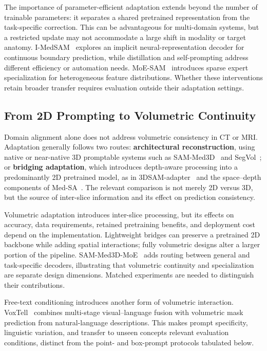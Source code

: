 \documentclass[5p,times,authoryear]{elsarticle}
\begin{document}
The importance of parameter-efficient adaptation extends beyond the number of trainable parameters: it separates a shared pretrained representation from the task-specific correction. This can be advantageous for multi-domain systems, but a restricted update may not accommodate a large shift in modality or target anatomy. I-MedSAM~\citep{wei2024imedsam} explores an implicit neural-representation decoder for continuous boundary prediction, while distillation and self-prompting address different efficiency or automation needs. MoE-SAM~\citep{li2025moe} introduces sparse expert specialization for heterogeneous feature distributions. Whether these interventions retain broader transfer requires evaluation outside their adaptation settings.

\subsection{From 2D Prompting to Volumetric Continuity}

Domain alignment alone does not address volumetric consistency in CT or MRI. Adaptation generally follows two routes: \textbf{architectural reconstruction}, using native or near-native 3D promptable systems such as SAM-Med3D~\citep{wang2025sam} and SegVol~\citep{du2024segvol}; or \textbf{bridging adaptation}, which introduces depth-aware processing into a predominantly 2D pretrained model, as in 3DSAM-adapter~\citep{gong20243dsam} and the space--depth components of Med-SA~\citep{wu2025medsa}. The relevant comparison is not merely 2D versus 3D, but the source of inter-slice information and its effect on prediction consistency.

Volumetric adaptation introduces inter-slice processing, but its effects on accuracy, data requirements, retained pretraining benefits, and deployment cost depend on the implementation. Lightweight bridges can preserve a pretrained 2D backbone while adding spatial interactions; fully volumetric designs alter a larger portion of the pipeline. SAM-Med3D-MoE~\citep{wang2024sam} adds routing between general and task-specific decoders, illustrating that volumetric continuity and specialization are separate design dimensions. Matched experiments are needed to distinguish their contributions.

Free-text conditioning introduces another form of volumetric interaction. VoxTell~\citep{rokuss2026voxtell_cvpr} combines multi-stage visual--language fusion with volumetric mask prediction from natural-language descriptions. This makes prompt specificity, linguistic variation, and transfer to unseen concepts relevant evaluation conditions, distinct from the point- and box-prompt protocols tabulated below.
\end{document}
